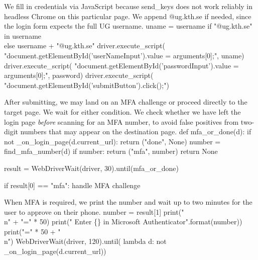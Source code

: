 We fill in credentials via JavaScript because {\Tt{}send{\_}keys\nwendquote} does not
work reliably in headless Chrome on this particular page.
We append {\Tt{}@ug.kth.se\nwendquote} if needed, since the login form expects the
full UG username.
\nwenddocs{}\endmoddef\nwstartdeflinemarkup{}\nwenddeflinemarkup
uname = username if "@ug.kth.se" in username \\
                 else username + "@ug.kth.se"
driver.execute_script(
  "document.getElementById('userNameInput').value = arguments[0];",
  uname)
driver.execute_script(
  "document.getElementById('passwordInput').value = arguments[0];",
  password)
driver.execute_script(
  "document.getElementById('submitButton').click();")
\nwendcode{}\nwdocspar

After submitting, we may land on an MFA challenge or proceed directly
to the target page.
We wait for either condition.
We check whether we have left the login page \emph{before} scanning for
an MFA number, to avoid false positives from two-digit numbers that may
appear on the destination page.
\nwenddocs{}\endmoddef\nwstartdeflinemarkup{}\nwenddeflinemarkup
def mfa_or_done(d):
  if not _on_login_page(d.current_url):
    return ("done", None)
  number = find_mfa_number(d)
  if number:
    return ("mfa", number)
  return None

result = WebDriverWait(driver, 30).until(mfa_or_done)

if result[0] == "mfa":
  \LA{}handle MFA challenge~{\nwtagstyle{}}\RA{}
\nwendcode{}\nwdocspar

When MFA is required, we print the number and wait up to two minutes
for the user to approve on their phone.
\nwenddocs{}\endmoddef\nwstartdeflinemarkup{}\nwenddeflinemarkup
number = result[1]
print("\\n" + "=" * 50)
print("  Enter  \{\}  in Microsoft Authenticator".format(number))
print("=" * 50 + "\\n")
WebDriverWait(driver, 120).until(
  lambda d: not _on_login_page(d.current_url))
\nwendcode{}\nwdocspar


